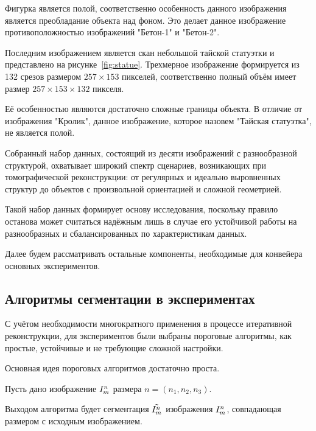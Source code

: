 Фигурка является полой, соответственно особенность данного изображения является преобладание объекта над фоном. Это делает данное изображение противоположностью изображений "Бетон-1" и "Бетон-2".


Последним изображением является скан небольшой тайской статуэтки и представлено на рисунке~\ref{fig:statue}. Трехмерное изображение формируется из 132 срезов размером \(257 \times 153\) пикселей, соответственно полный объём имеет размер \(257 \times 153 \times 132\) пикселя.

Её особенностью являются достаточно сложные границы объекта. В отличие от изображения "Кролик", данное изображение, которое назовем "Тайская статуэтка", не является полой.



Собранный набор данных, состоящий из десяти изображений с разнообразной структурой, охватывает широкий спектр сценариев, возникающих при томографической реконструкции: от регулярных и идеально выровненных структур до объектов с произвольной ориентацией и сложной геометрией.

Такой набор данных формирует основу исследования, поскольку правило останова может считаться надёжным лишь в случае его устойчивой работы на разнообразных и сбалансированных по характеристикам данных. 

Далее будем рассматривать остальные компоненты, необходимые для конвейера основных экспериментов.

\subsection{Алгоритмы сегментации в экспериментах}

С учётом необходимости многократного применения в процессе итеративной реконструкции, для экспериментов были выбраны пороговые алгоритмы, как простые, устойчивые и не требующие сложной настройки.

Основная идея пороговых алгоритмов достаточно проста. 

Пусть дано изображение \(I^n_m\) размера \(n = (n_1, n_2, n_3)\).

Выходом алгоритма будет сегментация \(\tilde{I^n_m}\) изображения \(I^n_m\), совпадающая размером с исходным изображением.

